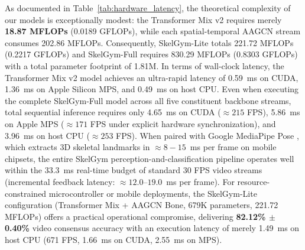 \documentclass[runningheads]{llncs}
\begin{document}
As documented in Table~\ref{tab:hardware_latency}, the theoretical complexity of our models is exceptionally modest: the Transformer Mix v2 requires merely \textbf{18.87 MFLOPs} (0.0189 GFLOPs), while each spatial-temporal AAGCN stream consumes 202.86 MFLOPs. Consequently, SkelGym-Lite totals 221.72 MFLOPs (0.2217 GFLOPs) and SkelGym-Full requires 830.29 MFLOPs (0.8303 GFLOPs) with a total parameter footprint of 1.81M.
In terms of wall-clock latency, the Transformer Mix v2 model achieves an ultra-rapid latency of 0.59~ms on CUDA, 1.36~ms on Apple Silicon MPS, and 0.49~ms on host CPU. Even when executing the complete SkelGym-Full model across all five constituent backbone streams, total sequential inference requires only 4.65~ms on CUDA ($\approx 215$ FPS), 5.86~ms on Apple MPS ($\approx 171$ FPS under explicit hardware synchronization), and 3.96~ms on host CPU ($\approx 253$ FPS). When paired with Google MediaPipe Pose \cite{chuankun2019,bazarevsky2020}, which extracts 3D skeletal landmarks in $\approx 8-15$~ms per frame on mobile chipsets, the entire SkelGym perception-and-classification pipeline operates well within the 33.3~ms real-time budget of standard 30 FPS video streams (incremental feedback latency: $\approx 12.0\text{--}19.0$~ms per frame). For resource-constrained microcontroller or mobile deployments, the SkelGym-Lite configuration (Transformer Mix + AAGCN Bone, 679K parameters, 221.72 MFLOPs) offers a practical operational compromise, delivering \textbf{82.12\% $\pm$ 0.40\%} video consensus accuracy with an execution latency of merely 1.49~ms on host CPU (671 FPS, 1.66~ms on CUDA, 2.55~ms on MPS).
\end{document}
